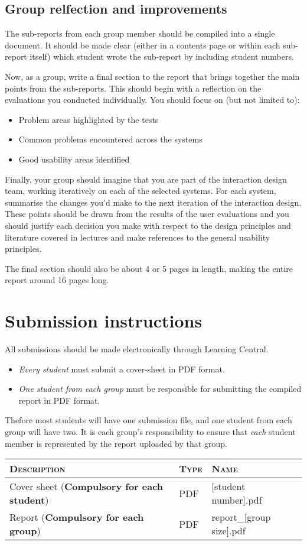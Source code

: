 \documentclass[11pt,a4paper]{report}
\begin{document}
\subsection*{Group relfection and improvements}
The sub-reports from each group member should be compiled into a single document. It should be made clear (either in a contents page or within each sub-report itself) which student wrote the sub-report by including student numbers.

Now, as a group, write a final section to the report that brings together the main points from the sub-reports. This should begin with a reflection on the evaluations you conducted individually. You should focus on (but not limited to):
\begin{itemize}
    \item Problem areas highlighted by the tests
    \item Common problems encountered across the systems  
    \item Good usability areas identified
\end{itemize}
Finally, your group should imagine that you are part of the interaction design team, working iteratively on each of the selected systems. For each system, summarise the changes you'd make to the next iteration of the interaction design. These points should be drawn from the results of the user evaluations and you should justify each decision you make with respect to the design principles and literature covered in lectures and make references to the general usability principles.      

The final section should also be about 4 or 5 pages in length, making the entire report around 16 pages long.

\section*{Submission instructions}
All submissions should be made electronically through Learning Central.

\begin{itemize}
    \item \textit{Every student} must submit a cover-sheet in PDF format.
    \item \textit{One student from each group} must be responsible for submitting the compiled report in PDF format.
\end{itemize}

Thefore most students will have one submission file, and one student from each group will have two. It is each group's responsibility to ensure that \textit{each} student member is represented by the report uploaded by that group.
\vskip15pt
\begin{tabular}{| l | l | l |}
    \hline
    \textsc{Description} & \textsc{Type} & \textsc{Name} \\
    \hline
    Cover sheet (\textbf{Compulsory for each student}) & PDF & [student number].pdf \\
    Report (\textbf{Compulsory for each group}) & PDF & report\_[group size].pdf \\ 
    \hline
\end{tabular}
\end{document}
